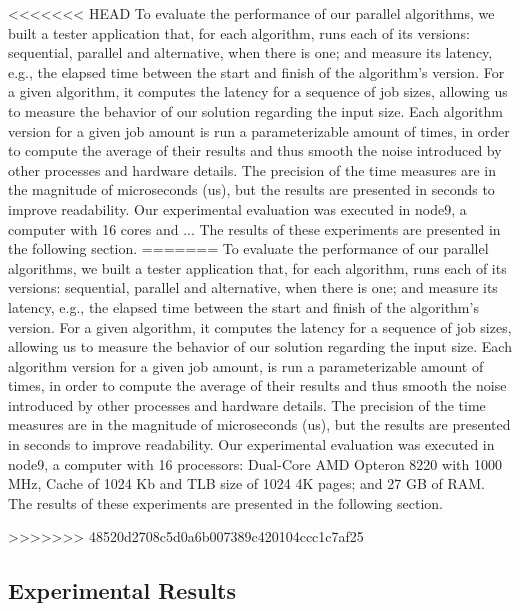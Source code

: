 \documentclass[conference,compsoc]{IEEEtran}
\begin{document}
<<<<<<< HEAD
To evaluate the performance of our parallel algorithms, we built a tester application that, for each algorithm, runs each of its versions: sequential, parallel and alternative, when there is one; and measure its latency, e.g., the elapsed time between the start and finish of the algorithm's version. For a given algorithm, it computes the latency for a sequence of job sizes, allowing us to measure the behavior of our solution regarding the input size. Each algorithm version for a given job amount is run a parameterizable amount of times, in order to compute the average of their results and thus smooth the noise introduced by other processes and hardware details. The precision of the time measures are in the magnitude of microseconds (us), but the results are presented in seconds to improve readability.
Our experimental evaluation was executed in node9, a computer with 16 cores and ... The results of these experiments are presented in the following section.
=======
To evaluate the performance of our parallel algorithms, we built a tester application that, for each algorithm, runs each of its versions: sequential, parallel and alternative, when there is one; and measure its latency, e.g., the elapsed time between the start and finish of the algorithm's version. For a given algorithm, it computes the latency for a sequence of job sizes, allowing us to measure the behavior of our solution regarding the input size. Each algorithm version for a given job amount, is run a parameterizable amount of times, in order to compute the average of their results and thus smooth the noise introduced by other processes and hardware details. The precision of the time measures are in the magnitude of microseconds (us), but the results are presented in seconds to improve readability.
Our experimental evaluation was executed in node9, a computer with 16 processors: Dual-Core AMD Opteron 8220 with 1000 MHz, Cache of 1024 Kb and
TLB size of 1024 4K pages; and 27 GB of RAM. The results of these experiments are presented in the following section.


>>>>>>> 48520d2708c5d0a6b007389c420104ccc1c7af25
\subsection{Experimental Results}
\end{document}
